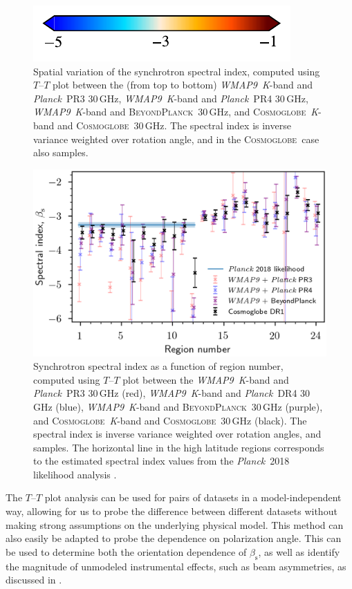 \documentclass[twocolumn]{../../common/aa}
\def\WMAPnine{\emph{WMAP9}}
\def\Planck{\emph{Planck}}
\newcommand{\BP}{\textsc{BeyondPlanck}}
\newcommand{\Cosmoglobe}{\textsc{Cosmoglobe}}
\newcommand{\K}[0]{\textit K}
\begin{document}
\begin{figure}
	\hspace{0.25cm}\includegraphics{figures/cbar_beta_wide.pdf}
	\caption{Spatial variation of the synchrotron spectral index, computed using $T$--$T$ plot between the (from top to bottom) \WMAPnine\ \K-band and \Planck\ PR3 30\,GHz, \WMAPnine\ \K-band and \Planck\ PR4 30\,GHz, \WMAPnine\ \K-band and \BP\ 30\,GHz, and \Cosmoglobe\ \K-band and \Cosmoglobe\ 30\,GHz. The spectral index is inverse variance weighted over rotation angle, and in the \Cosmoglobe\ case also samples.}
        \label{fig:TT_beta_maps}
\end{figure}
\begin{figure}
        \centering
        \includegraphics[width=\linewidth]{figures/cos30_region_beta_cosmoglobe_vs_wmap_all.png}
        \caption{Synchrotron spectral index as a function of region number, computed using $T$--$T$ plot between the \WMAPnine\ \K-band and \Planck\ PR3 30\,GHz (red), \WMAPnine\ \K-band and \Planck\ DR4 30\,GHz (blue), \WMAPnine\ \K-band and \BP\ 30\,GHz (purple), and \Cosmoglobe\ \K-band and \Cosmoglobe\ 30\,GHz (black). The spectral index is inverse variance weighted over rotation angles, and samples. The horizontal line in the high latitude regions corresponds to the estimated spectral index values from the \Planck\ 2018 likelihood analysis \citep{planck2016-l05}. }
        \label{fig:cos30_beta_region}
\end{figure}

The $T$--$T$ plot analysis can be used for pairs of datasets in a model-independent way, allowing for us to probe the difference between different datasets without making strong assumptions on the underlying physical model. This method can also easily be adapted to probe the dependence on polarization angle. This can be used to determine both the orientation dependence of $\beta_\mathrm s$, as well as identify the magnitude of unmodeled instrumental effects, such as beam asymmetries, as discussed in \citet{wehus:2013}.
\end{document}
